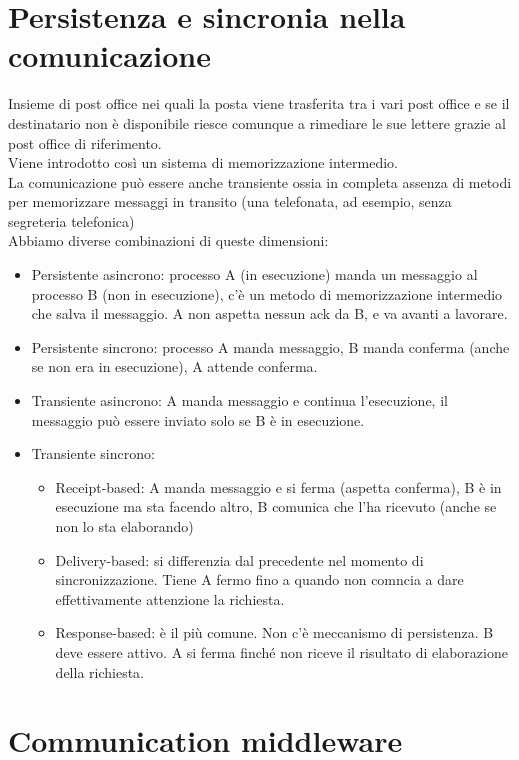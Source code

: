 \section{Persistenza e sincronia nella comunicazione}
Insieme di post office nei quali la posta viene trasferita tra i vari post office e se il destinatario non è disponibile riesce comunque a rimediare le sue lettere grazie al post office di riferimento. \\
Viene introdotto così un sistema di memorizzazione intermedio. \\
La comunicazione può essere anche transiente ossia in completa assenza di metodi per memorizzare messaggi in transito (una telefonata, ad esempio, senza segreteria telefonica)\\

Abbiamo diverse combinazioni di queste dimensioni:
\begin{itemize}
    \item Persistente asincrono: processo A (in esecuzione) manda un messaggio al processo B (non in esecuzione), c'è un metodo di memorizzazione intermedio che salva il messaggio. A non aspetta nessun ack da B, e va avanti a lavorare.
    \item Persistente sincrono: processo A manda messaggio, B manda conferma (anche se non era in esecuzione), A attende conferma.
    \item Transiente asincrono: A manda messaggio e continua l'esecuzione, il messaggio può essere inviato solo se B è in esecuzione.
    \item Transiente sincrono: 
    \begin{itemize}
        \item Receipt-based: A manda messaggio e si ferma (aspetta conferma), B è in esecuzione ma sta facendo altro, B comunica che l'ha ricevuto (anche se non lo sta elaborando)
        \item Delivery-based: si differenzia dal precedente nel momento di sincronizzazione. Tiene A fermo fino a quando non comncia a dare effettivamente attenzione la richiesta.
        \item Response-based: è il più comune. Non c'è meccanismo di persistenza. B deve essere attivo. A si ferma finché non riceve il risultato di elaborazione della richiesta.
    \end{itemize}
\end{itemize}


\section{Communication middleware}
